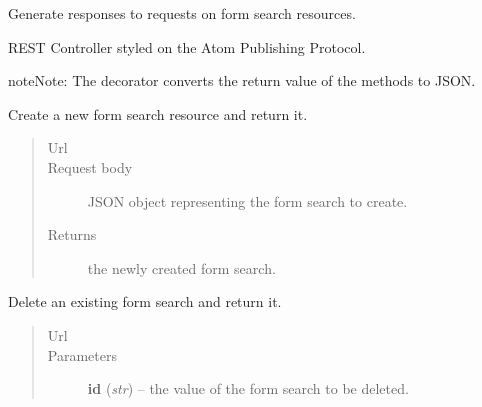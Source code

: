 \documentclass[letterpaper,10pt,english]{sphinxmanual}
\begin{document}
\begin{fulllineitems}
\label{api:onlinelinguisticdatabase.controllers.formsearches.FormsearchesController}
Generate responses to requests on form search resources.

REST Controller styled on the Atom Publishing Protocol.

\begin{notice}{note}{Note:}
The  decorator converts the return value of the methods to
JSON.
\end{notice}

\begin{fulllineitems}
\label{api:onlinelinguisticdatabase.controllers.formsearches.FormsearchesController.create}
Create a new form search resource and return it.
\begin{quote}\begin{description}
\item[{Url }] \leavevmode
{}

\item[{Request body}] \leavevmode
JSON object representing the form search to create.

\item[{Returns}] \leavevmode
the newly created form search.

\end{description}\end{quote}

\end{fulllineitems}


\begin{fulllineitems}
\label{api:onlinelinguisticdatabase.controllers.formsearches.FormsearchesController.delete}
Delete an existing form search and return it.
\begin{quote}\begin{description}
\item[{Url }] \leavevmode
{}

\item[{Parameters}] \leavevmode
\textbf{id} (\emph{str}) -- the  value of the form search to be deleted.


\end{description}
\end{quote}
\end{fulllineitems}
\end{fulllineitems}
\end{document}
